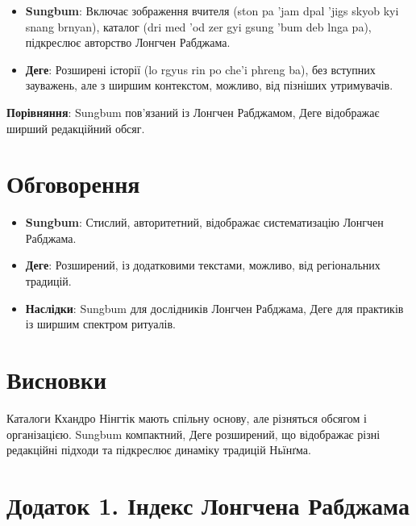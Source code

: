 \documentclass{article}
\begin{document}
\begingroup\raggedright
\begin{itemize}
    \item \textbf{Sungbum}: Включає зображення вчителя (ston pa 'jam dpal 'jigs skyob kyi snang brnyan), каталог (dri med 'od zer gyi gsung 'bum deb lnga pa), підкреслює авторство Лонгчен Рабджама.
    \item \textbf{Деге}: Розширені історії (lo rgyus rin po che'i phreng ba), без вступних зауважень, але з ширшим контекстом, можливо, від пізніших утримувачів.
\end{itemize}
\endgroup

\textbf{Порівняння}: Sungbum пов’язаний із Лонгчен Рабджамом, Деге відображає ширший редакційний обсяг.

\section{Обговорення}

\begingroup\raggedright
\begin{itemize}
    \item \textbf{Sungbum}: Стислий, авторитетний, відображає систематизацію Лонгчен Рабджама.
    \item \textbf{Деге}: Розширений, із додатковими текстами, можливо, від регіональних традицій.
    \item \textbf{Наслідки}: Sungbum для дослідників Лонгчен Рабджама, Деге для практиків із ширшим спектром ритуалів.
\end{itemize}
\endgroup

\section{Висновки}
Каталоги Кхандро Нінгтік мають спільну основу, але різняться обсягом і організацією. Sungbum компактний, Деге розширений, що відображає різні редакційні підходи та підкреслює динаміку традицій Ньїнґма.

\newpage
\section{Додаток 1. Індекс Лонгчена Рабджама}
\end{document}
